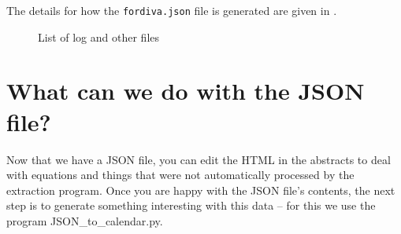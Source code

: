 The details for how the \texttt{fordiva.json} file is generated are given in .

 \begin{figure}[!ht]
  \begin{center}
  \end{center}
  \caption{List of log and other files}
  \label{fig:filesProduced}
\end{figure}
\clearpage

\section{What can we do with the JSON file?}
\label{sec:whatCanweDoWithTheJSONfile}
Now that we have a JSON file, you can edit the HTML in the abstracts to deal with equations and things that were not automatically processed by the extraction program. Once you are happy with the JSON file’s contents, the next step is to generate something interesting with this data – for this we use the program JSON\_to\_calendar.py. 




